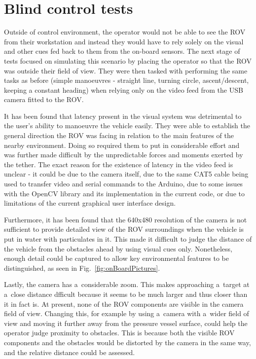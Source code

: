 \section{Blind control tests}

Outside of control environment, the operator would not be able to see the ROV from their
workstation and instead they would have to rely solely on the visual and other
cues fed back to them from the on-board sensors. The next stage of tests focused
on simulating this scenario by placing the operator so that the ROV was outside
their field of view. They were then tasked with performing the same tasks as before
(simple manoeuvres - straight line, turning circle, ascent/descent, keeping
a constant heading) when relying only on the video feed from the USB camera
fitted to the ROV.

It has been found that latency present in the visual system was detrimental to
the user's ability to manoeuvre the vehicle easily. They were able to establish
the general direction the ROV was facing in relation to the main features of the
nearby environment. Doing so required them to put in considerable effort and
was further made difficult by the unpredictable forces and moments exerted by
the tether. The exact reason for the existence of latency in the video feed is
unclear - it could be due to the camera itself, due to the same CAT5 cable being
used to transfer video and serial commands to the Arduino, due to some issues
with the OpenCV library and its implementation in the current code, or due to
limitations of the current graphical user interface design.

Furthermore, it has been found that the 640x480 resolution of the camera is not
sufficient to provide detailed view of the ROV surroundings when the vehicle is
put in water with particulates in it. This made it difficult to judge the distance
of the vehicle from the obstacles ahead by using visual cues only.
Nonetheless, enough detail could be captured to allow key environmental
features to be distinguished, as seen in Fig.~\ref{fig:onBoardPictures}.

Lastly, the camera has a~considerable zoom. This makes approaching a~target at 
a~close distance dfficult because it seems to be much larger and thus closer than it in fact is.
At present, none of the ROV components are visible in the camera field of view.
Changing this, for example by using a~camera with a~wider field of view and moving
it further away from the pressure vessel surface, could help the operator judge
proximity to obstacles. This is because both the visible ROV components and the
obstacles would be distorted by the camera in the same way, and the relative
distance could be assessed.

